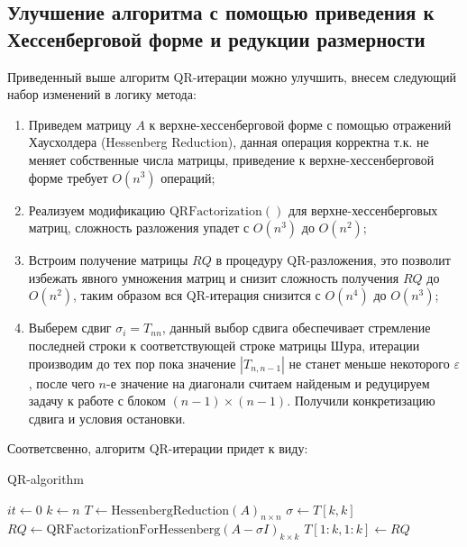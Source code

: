 \documentclass[a4paper,14pt]{extarticle}
\renewcommand{\epsilon}{\varepsilon}
\begin{document}
\subsection{Улучшение алгоритма с помощью приведения к Хессенберговой форме и редукции размерности}

Приведенный выше алгоритм QR-итерации можно улучшить, внесем следующий набор изменений в логику метода:

\begin{enumerate}
\item Приведем матрицу $A$ к верхне-хессенберговой форме с помощью отражений Хаусхолдера (Hessenberg Reduction), данная операция корректна т.к. не меняет собственные числа матрицы, приведение к верхне-хессенберговой форме требует $O(n^3)$ операций;

\item Реализуем модификацию $\mathrm{QRFactorization}()$ для верхне-хессенберговых матриц, сложность разложения упадет с $O(n^3)$ до $O(n^2)$;

\item Встроим получение матрицы $RQ$ в процедуру QR-разложения, это позволит избежать явного умножения матриц и снизит сложность получения $RQ$ до $O(n^2)$, таким образом вся QR-итерация снизится с $O(n^4)$ до $O(n^3)$;

\item Выберем сдвиг $\sigma_i = T_{nn}$, данный выбор сдвига обеспечивает стремление последней строки к соответствующей строке матрицы Шура, итерации производим до тех пор пока значение $|T_{n, n-1}|$ не станет меньше некоторого $\epsilon$, после чего $n$-е значение на диагонали считаем найденым и редуцируем задачу к работе с блоком $(n - 1) \times (n - 1)$. Получили конкретизацию сдвига и условия остановки.
\end{enumerate}

Соответсвенно, алгоритм QR-итерации придет к виду:

\vspace{8pt}
\begin{algorithm}[H]
\caption{QR-algorithm}
\vspace{4pt}
$it \gets 0$\;
$k \gets n$\;
$T \gets \mathrm{HessenbergReduction}(A)_{n \times n}$\;
 {
	$\sigma \gets T[k, k]$\;
	$RQ \gets \mathrm{QRFactorizationForHessenberg}(A - \sigma I)_{k \times k}$\;
	$T[1:k, 1:k] \gets RQ$\;
	\If{$|T[k, k-1]| < \epsilon$}{
		$k \gets k - 1$\;
	}
}
\end{algorithm}
\vspace{8pt}
\end{document}
